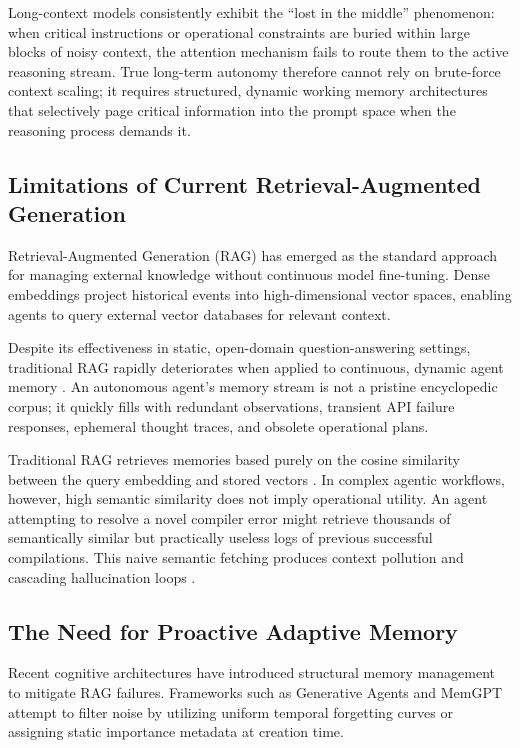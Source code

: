 \documentclass[conference]{IEEEtran}
\begin{document}
Long-context models consistently exhibit the ``lost in the middle'' phenomenon: when critical instructions or operational constraints are buried within large blocks of noisy context, the attention mechanism fails to route them to the active reasoning stream. True long-term autonomy therefore cannot rely on brute-force context scaling; it requires structured, dynamic working memory architectures that selectively page critical information into the prompt space when the reasoning process demands it.

\subsection{Limitations of Current Retrieval-Augmented Generation}
Retrieval-Augmented Generation (RAG) \cite{lewis2020retrieval} has emerged as the standard approach for managing external knowledge without continuous model fine-tuning. Dense embeddings project historical events into high-dimensional vector spaces, enabling agents to query external vector databases \cite{johnson2019billion} for relevant context.

Despite its effectiveness in static, open-domain question-answering settings, traditional RAG rapidly deteriorates when applied to continuous, dynamic agent memory \cite{gao2023retrieval}. An autonomous agent's memory stream is not a pristine encyclopedic corpus; it quickly fills with redundant observations, transient API failure responses, ephemeral thought traces, and obsolete operational plans.

Traditional RAG retrieves memories based purely on the cosine similarity between the query embedding and stored vectors \cite{karpukhin2020dense}. In complex agentic workflows, however, high semantic similarity does not imply operational utility. An agent attempting to resolve a novel compiler error might retrieve thousands of semantically similar but practically useless logs of previous successful compilations. This naive semantic fetching produces context pollution and cascading hallucination loops \cite{mallen2023trust}.

\subsection{The Need for Proactive Adaptive Memory}
Recent cognitive architectures have introduced structural memory management to mitigate RAG failures. Frameworks such as Generative Agents \cite{park2023generative} and MemGPT \cite{packer2023memgpt} attempt to filter noise by utilizing uniform temporal forgetting curves or assigning static importance metadata at creation time.
\end{document}
